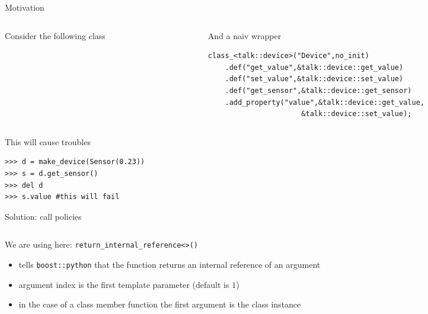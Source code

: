 
\begin{frame}[fragile]{Motivation}

    \begin{columns}[t]
        \begin{column}{0.49\linewidth}
            Consider the following class 
            \inputminted[fontsize=\tiny,firstline=26,lastline=36]{cpp}{../src/libtalk/include/talk/device.hpp}
        \end{column}
        \begin{column}{0.49\linewidth}
    And a naiv wrapper
    \begin{verbatim}
class_<talk::device>("Device",no_init)
    .def("get_value",&talk::device::get_value)
    .def("set_value",&talk::device::set_value)
    .def("get_sensor",&talk::device::get_sensor)
    .add_property("value",&talk::device::get_value,
                      &talk::device::set_value);
    \end{verbatim}
        \end{column}
    \end{columns}
    \vspace{0.1\textheight}
    This will cause troubles
    \begin{verbatim}
>>> d = make_device(Sensor(0.23))
>>> s = d.get_sensor()
>>> del d
>>> s.value #this will fail
    \end{verbatim}
\end{frame}

\begin{frame}[fragile]{Solution: call policies}
    \inputminted[fontsize=\small,firstline=59,lastline=65]{cpp}{../src/python-talk/src/sensor.cpp}

    \vspace{0.05\textheight}
    We are using here: \texttt{return\_internal\_reference<>()}
    \begin{itemize}
        \item tells \texttt{boost::python} that the function returns an
            internal reference of an argument
        \item argument index is the first template parameter (default is $1$)
        \item in the case of a class member function the first argument is the
            class instance
    \end{itemize}
\end{frame}
